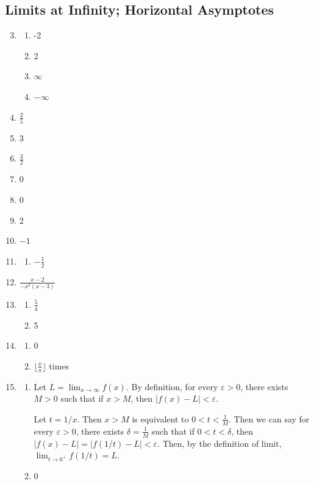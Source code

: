 \documentclass{article}
\begin{document}
\subsection{Limits at Infinity; Horizontal Asymptotes}
\begin{enumerate}
    \setcounter{enumi}{2}
  \item
    \begin{enumerate}
      \item -2
      \item 2
      \item $\infty$
      \item $-\infty$
    \end{enumerate}
    \setcounter{enumi}{6}
  \item $\frac{2}{5}$
  \item 3
  \item $\frac{3}{2}$
  \item 0
  \item 0
  \item 2
  \item $-1$
    \setcounter{enumi}{32}
  \item
    \begin{enumerate}
      \item $-\frac{1}{2}$
    \end{enumerate}
    \setcounter{enumi}{44}
  \item $\frac{x-2}{-x^2(x-3)}$
    \setcounter{enumi}{46}
  \item
    \begin{enumerate}
      \item $\frac{5}{4}$
      \item 5
    \end{enumerate}
    \setcounter{enumi}{60}
  \item
    \begin{enumerate}
      \item 0
      \item $\lfloor\frac{x}{\pi}\rfloor$ times
    \end{enumerate}
    \setcounter{enumi}{72}
  \item
    \begin{enumerate}
      \item Let $L=\lim_{x\to\infty}f(x)$. By definition, for every $\varepsilon>0$, there exists
        $M>0$ such that if $x>M$, then $|f(x)-L|<\varepsilon$.

        Let $t=1/x$. Then $x>M$ is equivalent to $0<t<\frac{1}{M}$. Then we can say for every
        $\varepsilon>0$, there exists $\delta=\frac{1}{M}$ such that if $0<t<\delta$, then $|f(x)-L|
        =|f(1/t)-L|<\varepsilon$. Then, by the definition of limit, $\lim_{t\to0^+}f(1/t)=L$.
      \item 0
    \end{enumerate}
\end{enumerate}
\end{document}
